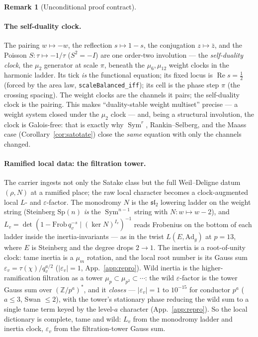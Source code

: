 \documentclass[11pt]{article}
\theoremstyle{definition}
\newtheorem{remark}[theorem]{Remark}
\renewcommand{\Re}{\operatorname{Re}}
\newcommand{\Sym}{\operatorname{Sym}}
\begin{document}
\begin{remark}[Unconditional proof contract]
\begin{enumerate}
\paragraph{The self-duality clock.} The pairing $w\mapsto-w$, the reflection $s\mapsto1-s$, the
conjugation $z\mapsto\bar z$, and the Poisson $S:\tau\mapsto-1/\tau$ ($S^2=-I$) are one order-two
involution --- the \emph{self-duality clock}, the $\mu_2$ generator at scale $\pi$, beneath the
$\mu_6,\mu_{12}$ weight clocks in the harmonic ladder. Its tick \emph{is} the functional equation; its
fixed locus is $\Re s=\tfrac12$ (forced by the area law, \texttt{scaleBalanced\_iff}); its cell is the
phase step $\pi$ (the crossing spacing). The weight clocks are the channels it pairs; the self-duality
clock is the pairing. This makes ``duality-stable weight multiset'' precise --- a weight system closed
under the $\mu_2$ clock --- and, being a structural involution, the clock is Galois-free: that is exactly
why $\Sym^r$, Rankin--Selberg, and the Maass case (Corollary~\ref{cor:satotate}) close the \emph{same}
equation with only the channels changed.

\paragraph{Ramified local data: the filtration tower.} The carrier ingests not only the Satake class
but the full Weil--Deligne datum $(\rho,N)$ at a ramified place; the raw local character becomes a
clock-augmented local $L$- and $\varepsilon$-factor. The monodromy $N$ is the $\mathfrak{sl}_2$ lowering
ladder on the weight string (Steinberg $\mathrm{Sp}(n)$ \emph{is} the $\Sym^{n-1}$ string with $N:w\mapsto
w-2$), and $L_v=\det(1-\mathrm{Frob}\,q_v^{-s}\mid(\ker N)^{I_v})^{-1}$ reads Frobenius on the bottom of
each ladder inside the inertia-invariants --- as in the twist $L(E,\mathrm{Ad}_g)$ at $p=13$, where $E$ is
Steinberg and the degree drops $2\to1$. The inertia is a root-of-unity clock: tame inertia is a $\mu_m$
rotation, and the local root number is its Gauss sum $\varepsilon_v=\tau(\chi)/q_v^{a/2}$ ($|\varepsilon_v|
=1$, App.~\ref{app:repro}). Wild inertia is the higher-ramification filtration as a tower $\mu_p\subset
\mu_{p^2}\subset\cdots$: the wild $\varepsilon$-factor is the tower Gauss sum over $(\mathbb Z/p^a)^*$, and
it \emph{closes} --- $|\varepsilon_v|=1$ to $10^{-15}$ for conductor $p^a$ ($a\le3$, Swan $\le2$), with the
tower's stationary phase reducing the wild sum to a single tame term keyed by the level-$a$ character
(App.~\ref{app:repro}). So the local dictionary is complete, tame and wild: $L_v$ from the monodromy
ladder and inertia clock, $\varepsilon_v$ from the filtration-tower Gauss sum.


\end{enumerate}
\end{remark}
\end{document}
